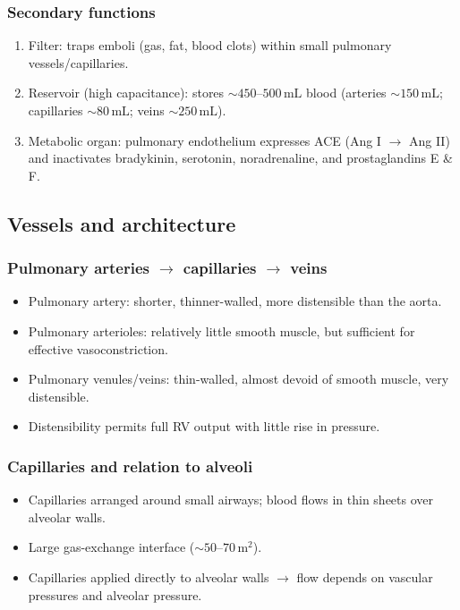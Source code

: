 \documentclass[11pt,a4paper]{article}
\begin{document}
\subsubsection{Secondary functions}
\begin{enumerate}
  \item Filter: traps emboli (gas, fat, blood clots) within small pulmonary vessels/capillaries.
  \item Reservoir (high capacitance): stores \(\sim 450\text{--}500\,\mathrm{mL}\) blood (arteries \(\sim 150\,\mathrm{mL}\); capillaries \(\sim 80\,\mathrm{mL}\); veins \(\sim 250\,\mathrm{mL}\)).
  \item Metabolic organ: pulmonary endothelium expresses ACE (Ang I \(\rightarrow\) Ang II) and inactivates bradykinin, serotonin, noradrenaline, and prostaglandins E \& F.
\end{enumerate}

\subsection{Vessels and architecture}
\subsubsection{Pulmonary arteries \(\rightarrow\) capillaries \(\rightarrow\) veins}
\begin{itemize}
  \item Pulmonary artery: shorter, thinner-walled, more distensible than the aorta.
  \item Pulmonary arterioles: relatively little smooth muscle, but sufficient for effective vasoconstriction.
  \item Pulmonary venules/veins: thin-walled, almost devoid of smooth muscle, very distensible.
  \item Distensibility permits full RV output with little rise in pressure.
\end{itemize}

\subsubsection{Capillaries and relation to alveoli}
\begin{itemize}
  \item Capillaries arranged around small airways; blood flows in thin sheets over alveolar walls.
  \item Large gas-exchange interface (\(\sim 50\text{--}70\,\mathrm{m^2}\)).
  \item Capillaries applied directly to alveolar walls \(\rightarrow\) flow depends on vascular pressures and alveolar pressure.
\end{itemize}
\end{document}
